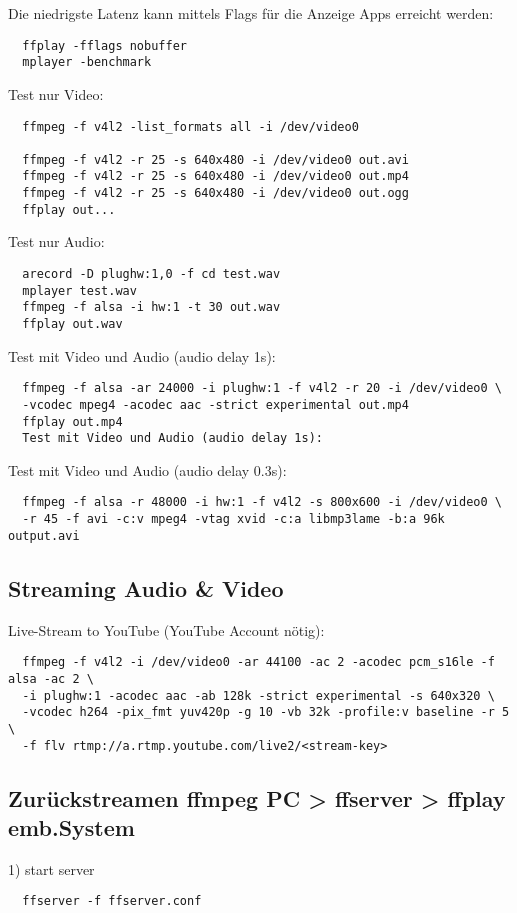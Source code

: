 Die niedrigste Latenz kann mittels Flags für die Anzeige Apps erreicht werden:
\begin{verbatim}
  ffplay -fflags nobuffer 
  mplayer -benchmark
\end{verbatim}

Test nur Video:
\begin{verbatim}
  ffmpeg -f v4l2 -list_formats all -i /dev/video0

  ffmpeg -f v4l2 -r 25 -s 640x480 -i /dev/video0 out.avi
  ffmpeg -f v4l2 -r 25 -s 640x480 -i /dev/video0 out.mp4
  ffmpeg -f v4l2 -r 25 -s 640x480 -i /dev/video0 out.ogg
  ffplay out...
\end{verbatim}

Test nur Audio:
\begin{verbatim}
  arecord -D plughw:1,0 -f cd test.wav
  mplayer test.wav
  ffmpeg -f alsa -i hw:1 -t 30 out.wav
  ffplay out.wav
\end{verbatim}

Test mit Video und Audio (audio delay 1s):
\begin{verbatim}
  ffmpeg -f alsa -ar 24000 -i plughw:1 -f v4l2 -r 20 -i /dev/video0 \
  -vcodec mpeg4 -acodec aac -strict experimental out.mp4
  ffplay out.mp4
  Test mit Video und Audio (audio delay 1s):
\end{verbatim}
Test mit Video und Audio (audio delay 0.3s):
\begin{verbatim}
  ffmpeg -f alsa -r 48000 -i hw:1 -f v4l2 -s 800x600 -i /dev/video0 \
  -r 45 -f avi -c:v mpeg4 -vtag xvid -c:a libmp3lame -b:a 96k output.avi
\end{verbatim}

\subsection{Streaming Audio \& Video}
Live-Stream to YouTube (YouTube Account nötig):
\begin{verbatim}
  ffmpeg -f v4l2 -i /dev/video0 -ar 44100 -ac 2 -acodec pcm_s16le -f alsa -ac 2 \
  -i plughw:1 -acodec aac -ab 128k -strict experimental -s 640x320 \
  -vcodec h264 -pix_fmt yuv420p -g 10 -vb 32k -profile:v baseline -r 5 \ 
  -f flv rtmp://a.rtmp.youtube.com/live2/<stream-key>
\end{verbatim}

\subsection{Zurückstreamen ffmpeg PC > ffserver > ffplay emb.System} \label{RefBack}
1) start server
\begin{verbatim}
  ffserver -f ffserver.conf
\end{verbatim}

